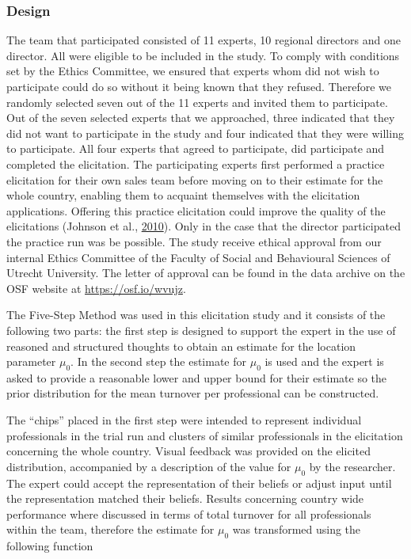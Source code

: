 \documentclass[openright,titlepage,12pt,a4paper]{book}
\begin{document}
\hypertarget{design-2}{%
\subsubsection{Design}\label{design-2}}

The team that participated consisted of 11 experts, 10 regional directors and one director. All were eligible to be included in the study. To comply with conditions set by the Ethics Committee, we ensured that experts whom did not wish to participate could do so without it being known that they refused. Therefore we randomly selected seven out of the 11 experts and invited them to participate. Out of the seven selected experts that we approached, three indicated that they did not want to participate in the study and four indicated that they were willing to participate. All four experts that agreed to participate, did participate and completed the elicitation. The participating experts first performed a practice elicitation for their own sales team before moving on to their estimate for the whole country, enabling them to acquaint themselves with the elicitation applications. Offering this practice elicitation could improve the quality of the elicitations (Johnson et al., \protect\hyperlink{ref-johnson_methods_2010}{2010}). Only in the case that the director participated the practice run was be possible. The study receive ethical approval from our internal Ethics Committee of the Faculty of Social and Behavioural Sciences of Utrecht University. The letter of approval can be found in the data archive on the OSF website at \url{https://osf.io/wvujz}.

The Five-Step Method was used in this elicitation study and it consists of the following two parts: the first step is designed to support the expert in the use of reasoned and structured thoughts to obtain an estimate for the location parameter \(\mu_0\). In the second step the estimate for \(\mu_0\) is used and the expert is asked to provide a reasonable lower and upper bound for their estimate so the prior distribution for the mean turnover per professional can be constructed.

The ``chips'' placed in the first step were intended to represent individual professionals in the trial run and
clusters of similar professionals in the elicitation concerning the whole country. Visual feedback was provided on the elicited distribution, accompanied by a description of the value for \(\mu_0\) by the researcher. The expert could accept the representation of their beliefs or adjust input until the representation matched their beliefs. Results concerning country wide performance where discussed in terms of total turnover for all professionals within the team, therefore the estimate for \(\mu_0\) was transformed using the following function
\end{document}
